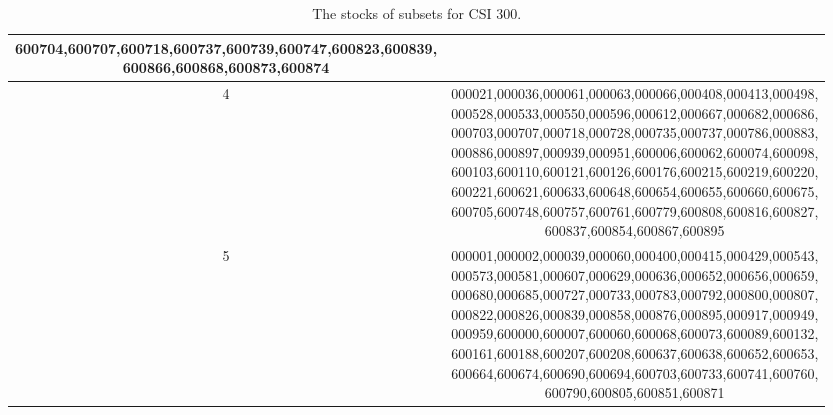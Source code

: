 \documentclass[sigconf]{acmart}
\begin{document}
\begin{table}[htp]
\begin{tabular}{@{} c @{} || c  @{}}
{        600704,600707,600718,600737,600739,600747,600823,600839,\\
        600866,600868,600873,600874} \\ \midrule
		4 & \makecell[l]{000021,000036,000061,000063,000066,000408,000413,000498,\\
        000528,000533,000550,000596,000612,000667,000682,000686,\\
        000703,000707,000718,000728,000735,000737,000786,000883,\\
        000886,000897,000939,000951,600006,600062,600074,600098,\\
        600103,600110,600121,600126,600176,600215,600219,600220,\\
        600221,600621,600633,600648,600654,600655,600660,600675,\\
        600705,600748,600757,600761,600779,600808,600816,600827,\\
        600837,600854,600867,600895} \\ \midrule
		5 & \makecell[l]{000001,000002,000039,000060,000400,000415,000429,000543,\\
        000573,000581,000607,000629,000636,000652,000656,000659,\\
        000680,000685,000727,000733,000783,000792,000800,000807,\\
        000822,000826,000839,000858,000876,000895,000917,000949,\\
        000959,600000,600007,600060,600068,600073,600089,600132,\\
        600161,600188,600207,600208,600637,600638,600652,600653,\\
        600664,600674,600690,600694,600703,600733,600741,600760,\\
        600790,600805,600851,600871} \\ \midrule
		
	\end{tabular}
		\caption{The stocks of subsets for CSI 300.}
	\label{tab:stock-subset-cn}
\end{table}
\end{document}

